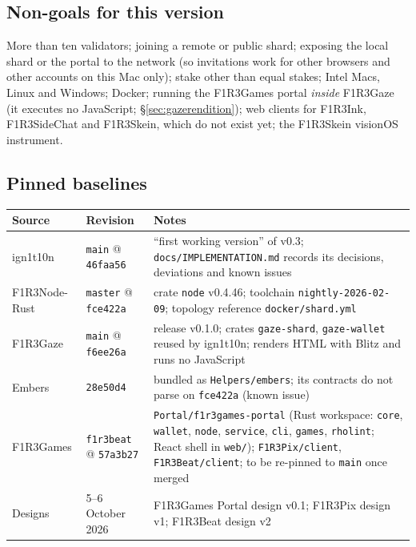 \documentclass[11pt]{article}
\theoremstyle{definition}
\theoremstyle{remark}
\newcommand{\code}[1]{\texttt{#1}}
\newcommand{\Gz}{F1R3Gaze}
\newcommand{\Hr}{ign1t10n}
\newcommand{\Nd}{F1R3Node-Rust}
\newcommand{\Gm}{F1R3Games}
\newcommand{\Em}{Embers}
\begin{document}
\subsection{Non-goals for this version}

More than ten validators; joining a remote or public shard; exposing the local shard
or the portal to the network (so invitations work for other browsers and other
accounts on this Mac only); stake other than equal stakes; Intel Macs, Linux and
Windows; Docker; running the \Gm{} portal \emph{inside} \Gz{} (it executes no
JavaScript; \S\ref{sec:gazerendition}); web clients for F1R3Ink, F1R3SideChat and
F1R3Skein, which do not exist yet; the F1R3Skein visionOS instrument.

\subsection{Pinned baselines}

\begin{center}\small
\renewcommand{\arraystretch}{1.15}
\begin{tabularx}{\linewidth}{@{}p{2.6cm}p{3.0cm}X@{}}
\toprule
Source & Revision & Notes\\
\midrule
\Hr{} & \code{main} @ \code{46faa56} & ``first working version'' of v0.3; \code{docs/IMPLEMENTATION.md} records its decisions, deviations and known issues\\
\Nd{} & \code{master} @ \code{fce422a} & crate \code{node} v0.4.46; toolchain \code{nightly-2026-02-09}; topology reference \code{docker/shard.yml}\\
\Gz{} & \code{main} @ \code{f6ee26a} & release v0.1.0; crates \code{gaze-shard}, \code{gaze-wallet} reused by \Hr{}; renders HTML with Blitz and runs no JavaScript\\
\Em{} & \code{28e50d4} & bundled as \code{Helpers/embers}; its contracts do not parse on \code{fce422a} (known issue)\\
\Gm{} & \code{f1r3beat} @ \code{57a3b27} & \code{Portal/f1r3games-portal} (Rust workspace: \code{core}, \code{wallet}, \code{node}, \code{service}, \code{cli}, \code{games}, \code{rholint}; React shell in \code{web/}); \code{F1R3Pix/client}, \code{F1R3Beat/client}; to be re-pinned to \code{main} once merged\\
Designs & 5--6 October 2026 & \Gm{} Portal design v0.1; F1R3Pix design v1; F1R3Beat design v2\\
\bottomrule
\end{tabularx}
\end{center}
\end{document}
